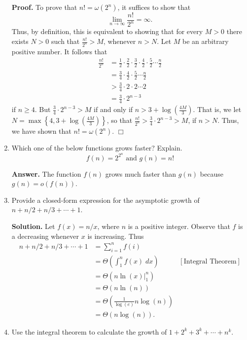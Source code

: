 \documentclass[9pt]{article}
\newcommand{\qed}{\hfill \ensuremath{\Box}}
\begin{document}
\begin{enumerate}
      \textbf{Proof.} To prove that $n! = \omega(2^n)$, it suffices to show that
      $$\lim_{n \rightarrow \infty} \frac{n!}{2^n} = \infty.$$
      Thus, by definition, this is equivalent to showing that for every $M > 0$
      there exists $N > 0$ such that $\frac{n!}{2^n} > M$, whenever $n > N$. Let
      $M$ be an arbitrary positive number. It follows that
      \begin{align*}
         \frac{n!}{2^n} &= \frac{1}{2}\cdot\frac{2}{2}\cdot\frac{3}{2}\cdot
         \frac{4}{2}\cdot\frac{5}{2}\cdots\frac{n}{2} \\
         &= \frac{3}{4} \cdot \frac{4}{2}\cdot\frac{5}{2}\cdots\frac{n}{2} \\
         &> \frac{3}{4} \cdot 2 \cdot 2 \cdots 2 \\
         &= \frac{3}{4} \cdot 2^{n-3}
      \end{align*}
      if $n \ge 4$. But $\frac{3}{4} \cdot 2^{n-3} > M$ if and only if
      $n > 3 + \log\left(\frac{4M}{3}\right)$. That is, we let
      $N = \max\left\{4, 3 + \log\left(\frac{4M}{3}\right)\right\}$, so that
      $\frac{n!}{2^n} > \frac{3}{4} \cdot 2^{n-3} > M$, if $n > N$. Thus, we
      have shown that $n! = \omega(2^n)$. \qed
   \item Which one of the below functions grows faster? Explain.
         $$f(n) = 2^{2^n} \text{ and } g(n) = n!$$

      \textbf{Answer.} The function $f(n)$ grows much faster than $g(n)$
      because $g(n) = o(f(n))$.
   \item Provide a closed-form expression for the asymptotic growth of
         $n + n/2 + n/3 + \cdots + 1$.

      \textbf{Solution.} Let $f(x) = n/x$, where $n$ is a positive integer.
      Observe that $f$ is a decreasing whenever $x$ is increasing. Thus
      \begin{align*}
         n + n/2 + n/3 + \cdots + 1 &= \sum_{i=1}^nf(i) \\
            &= \Theta\left(\int_1^n f(x)\;dx\right) &[\text{Integral Theorem}]\\
            &= \Theta\left(n\ln(x)\bigg|_1^n\right) \\
            &= \Theta(n\ln(n)) \\
            &= \Theta\left(\frac{1}{\log(e)}n\log(n)\right) \\
            &= \Theta(n\log(n)).
      \end{align*}
   \item Use the integral theorem to calculate the growth of
         $1 + 2^k + 3^k + \cdots + n^k$.


\end{enumerate}
\end{document}
